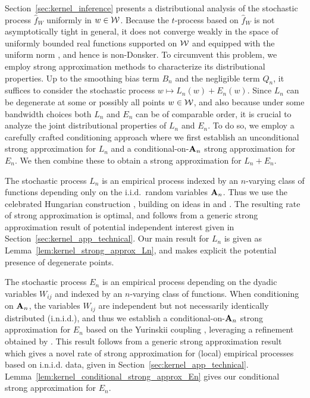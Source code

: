 Section~\ref{sec:kernel_inference} presents a distributional analysis of the
stochastic process $\hat{f}_W$ uniformly in $w \in \mathcal{W}$. Because the
$t$-process based on $\hat{f}_W$ is
not asymptotically tight in general, it does not converge weakly in the space
of uniformly bounded real functions supported on $\mathcal{W}$ and equipped with the
uniform norm \citep{van1996weak}, and hence is non-Donsker. To circumvent this
problem, we employ strong approximation methods to characterize its
distributional properties. Up to the smoothing bias term $B_n$ and the
negligible term $Q_n$, it suffices to consider the stochastic process
$w \mapsto L_n(w)+E_n(w)$. Since $L_n$ can be degenerate at some or possibly all
points $w\in\mathcal{W}$, and also because under some bandwidth choices both $L_n$ and
$E_n$ can be of comparable order, it is crucial to analyze the joint
distributional properties of $L_n$ and $E_n$. To do so, we employ a carefully
crafted conditioning approach where we first establish an unconditional strong
approximation for $L_n$ and a conditional-on-$\mathbf{A}_n$ strong approximation for
$E_n$. We then combine these to obtain a strong approximation for $L_n+E_n$.

The stochastic process $L_n$ is an empirical process indexed by an $n$-varying
class of functions depending only on the i.i.d.\ random variables $\mathbf{A}_n$. Thus
we use the celebrated Hungarian construction \citep{komlos1975approximation},
building on ideas in \citet{gine2004kernel} and \citet{gine2010confidence}. The
resulting rate of strong approximation is optimal, and follows from a generic
strong approximation result of potential independent interest given in
Section~\ref{sec:kernel_app_technical}. Our main result for $L_n$ is given as
Lemma~\ref{lem:kernel_strong_approx_Ln}, and makes explicit the potential
presence of
degenerate points.

The stochastic process $E_n$ is an empirical process depending on the dyadic
variables $W_{i j}$ and indexed by an $n$-varying class of functions. When
conditioning on $\mathbf{A}_n$, the variables $W_{i j}$ are independent but not
necessarily identically distributed (i.n.i.d.), and thus we establish a
conditional-on-$\mathbf{A}_n$ strong approximation for $E_n$ based on the Yurinskii
coupling \citep{yurinskii1978error}, leveraging a refinement obtained by
\citet*[Lemma~38]{belloni2019conditional}. This result follows from a generic
strong approximation result which gives a novel rate of strong approximation
for (local) empirical processes based on i.n.i.d. data, given in
Section~\ref{sec:kernel_app_technical}.
Lemma~\ref{lem:kernel_conditional_strong_approx_En} gives our conditional strong
approximation for $E_n$.


